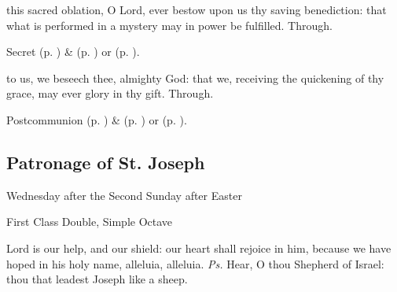 \secret\label{EasterIISecret}
 this sacred oblation, O Lord, ever bestow upon us thy saving benediction: that what is performed in a mystery may in power be fulfilled. Through.
\begin{rubric}
     Secret  (p. \pageref{SPMaryInEaster}) \&   (p. \pageref{SPAgainst}) or  (p. \pageref{SPChiefBishop}).
\end{rubric}
\postcommunion\label{EasterIIPostcommunion}
 to us, we beseech thee, almighty God: that we, receiving the quickening of thy grace, may ever glory in thy gift. Through.


\begin{rubric}
     Postcommunion  (p. \pageref{SPMaryInEaster}) \&   (p. \pageref{SPAgainst}) or  (p. \pageref{SPChiefBishop}).
\end{rubric}


\clearpage
\subsection{Patronage of St. Joseph}
\begin{inhead}
    {Wednesday after the Second Sunday after Easter}\par
    {First Class Double, Simple Octave}
\end{inhead}


\vspace{-0.15\baselineskip}

\introit

\vspace{-0.1\baselineskip}

 Lord is our help, and our shield: our heart shall rejoice in him, because we have hoped in his holy name, alleluia, alleluia. \textit{Ps.} Hear, O thou Shepherd of Israel: thou that leadest Joseph like a sheep.

\vspace{-0.15\baselineskip}

\collect

